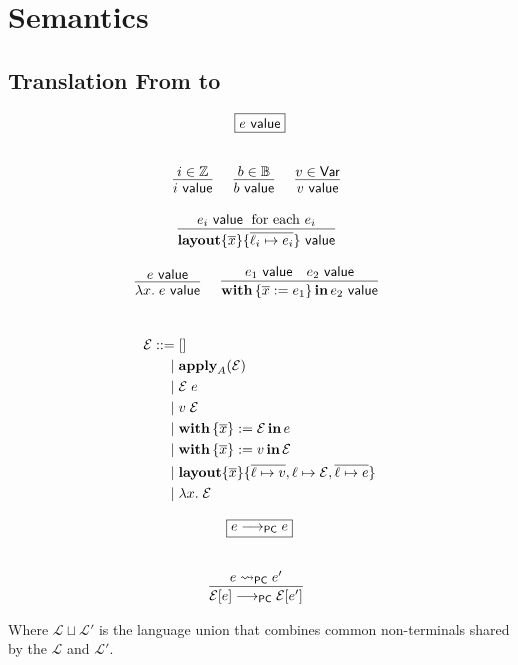 \section{Semantics}

\subsection{Translation From \Pika{} to \PikaCore}


\[
  \begin{array}{c}
    \fbox{$e ~\val$}
    \fboxNewlines
    \labinfer{i ~\val}{i \in \mathbb{Z}}
    ~~~
    \labinfer{b ~\val}{b \in \mathbb{B}}
    ~~~
    \labinfer{v ~\val}{v \in \Var}
    \\\\
    \labinfer{\sslmath{\overline{x}}{\overline{\ell_i \mapsto e_i}} ~\val}
      {e_i ~\val \;\textrm{ for each $e_i$}}
    \\\\
    \labinfer{\lambda x.\; e ~\val}{e ~\val}
    ~~~
    \labinfer{\withIn{\{\overline{x} := e_1\}} e_2 ~\val}
      {e_1 ~\val & e_2 ~\val}
  \end{array}
\]
\\

\[
  \begin{aligned}
  \mathcal{E}
    ::=\; &[]\\
    \mid\; &\textbf{apply}_A(\mathcal{E})\\
    \mid\; &\mathcal{E}\; e\\
    \mid\; &v\; \mathcal{E}\\
    \mid\; &\textbf{with}\,\{ \overline{x} \} := \mathcal{E}\,\textbf{in}\, e\\
    \mid\; &\textbf{with}\,\{ \overline{x} \} := v\,\textbf{in}\, \mathcal{E}\\
    \mid\; &\textbf{layout}\{ \overline{x} \}\{ \overline{\ell \mapsto v}, \ell \mapsto \mathcal{E}, \overline{\ell \mapsto e} \}\\
    \mid\; &\lambda x.\; \mathcal{E}
  \end{aligned}
\]

\[
  \begin{array}{c}
    \fbox{$e \pcstep e$}
    \fboxNewlines
    \labinfer{\mathcal{E}[e] \pcstep \mathcal{E}[e']}
      {e \pcNotionStep e'}
  \end{array}
\]

Where $\mathcal{L} \sqcup \mathcal{L}'$ is the language union that combines common non-terminals shared by the $\mathcal{L}$ and $\mathcal{L}'$.

